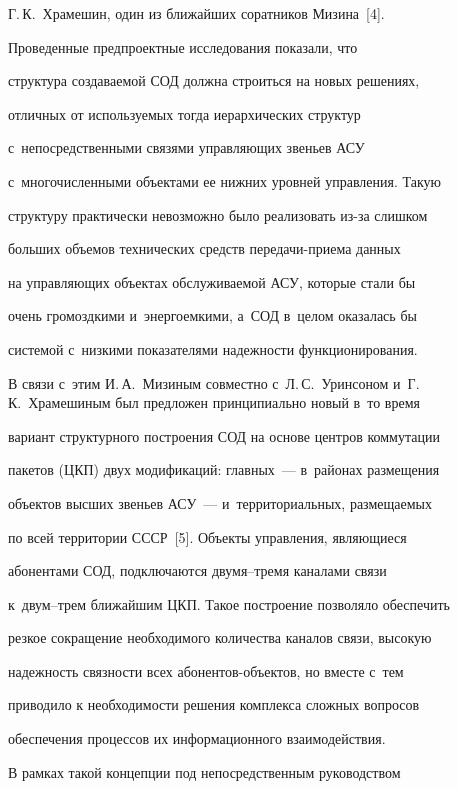 Г.\,К.~Храмешин, один из ближайших соратников Мизина~[4].





    Проведенные предпроектные исследования показали, что


структура создаваемой СОД должна строиться на новых решениях,


отличных от используемых тогда иерархических структур


с~непосредственными связями управляющих звень\-ев АСУ


с~многочисленными объектами ее нижних уровней управления. Такую


структуру практически невозможно было реализовать из-за слишком


больших объемов технических средств пе\-ре\-да\-чи-при\-ема данных


на управляющих объектах обслуживаемой АСУ, которые стали бы


очень громоздкими и~энергоемкими, а~СОД в~целом оказалась бы


системой с~низкими показателями надежности функционирования.





    В связи с~этим И.\,А.~Мизиным совместно с~Л.\,С.~Уринсоном и~Г.\,К.~Храмешиным был предложен принципиально новый в~то время


вариант структурного построения СОД на основе центров коммутации


пакетов (ЦКП) двух модификаций: главных~--- в~районах размещения


объектов высших звеньев АСУ~--- и~территориальных, размещаемых


по всей территории СССР~[5]. Объекты управ\-ле\-ния, являющиеся


абонентами СОД, подключаются дву\-мя--тре\-мя каналами связи


к~двум--трем ближайшим ЦКП. Такое построение позволяло обеспечить


резкое сокращение необходимого количества каналов связи, высокую


надежность связности всех або\-нен\-тов-объек\-тов, но вместе с~тем


приводило к необходимости решения комплекса сложных вопросов


обеспечения процессов их информационного взаимодействия.





    В рамках такой концепции под непосредственным руководством


